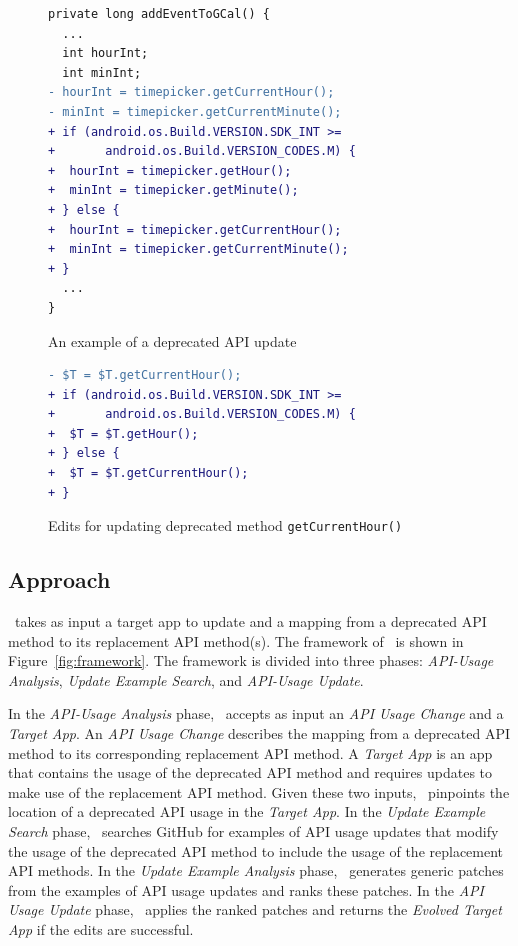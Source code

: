 \begin{figure}[htb]
\centering
\begin{lstlisting}[language=diff,numbers=none]
private long addEventToGCal() {
  ...
  int hourInt;
  int minInt;
- hourInt = timepicker.getCurrentHour();
- minInt = timepicker.getCurrentMinute();
+ if (android.os.Build.VERSION.SDK_INT >= 
+       android.os.Build.VERSION_CODES.M) {
+  hourInt = timepicker.getHour();
+  minInt = timepicker.getMinute();
+ } else {
+  hourInt = timepicker.getCurrentHour();
+  minInt = timepicker.getCurrentMinute();
+ }
  ...
}
\end{lstlisting}
\caption{An example of a deprecated API update}
\label{fig:deprecated_api_update_example}
\end{figure}

\begin{figure}[htb]
\centering
\begin{lstlisting}[language=diff,numbers=none]
- $T = $T.getCurrentHour();
+ if (android.os.Build.VERSION.SDK_INT >= 
+       android.os.Build.VERSION_CODES.M) {
+  $T = $T.getHour();
+ } else {
+  $T = $T.getCurrentHour();
+ }
\end{lstlisting}
\caption{Edits for updating deprecated method \texttt{getCurrentHour()}}
\label{fig:deprecated_api_update_edits}
\end{figure}

\subsection{Approach}
\toolname\ takes as input a target app to update and a mapping from a deprecated API method to its replacement API method(s). The framework of \toolname\ is shown in Figure~\ref{fig:framework}. The framework is divided into three phases: {\em API-Usage Analysis}, {\em Update Example Search}, and {\em API-Usage Update}. 

In the {\em API-Usage Analysis} phase, \toolname\ accepts as input an {\em API Usage Change} and a {\em Target App}. An {\em API Usage Change} describes the mapping from a deprecated API method to its corresponding replacement API method. A {\em Target App} is an app that contains the usage of the deprecated API method  and requires updates to make use of the replacement API method. Given these two inputs, \toolname\ pinpoints the location of a deprecated API usage in the {\em Target App}. In the {\em Update Example Search} phase, \toolname\ searches GitHub for examples of API usage updates that modify the usage of the deprecated API method to include the usage of the replacement API methods. In the {\em Update Example Analysis} phase, \toolname\ generates generic patches from the examples of API usage updates and ranks these patches. In the {\em API Usage Update} phase, \toolname\ applies the ranked patches and returns the {\em Evolved Target App} if the edits are successful.


